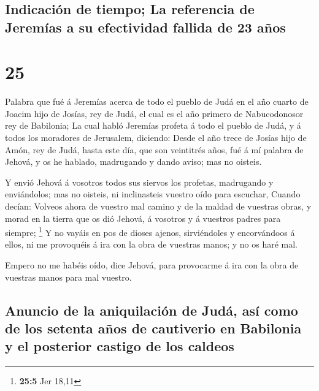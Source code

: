 \hypertarget{indicaciuxf3n-de-tiempo-la-referencia-de-jeremuxedas-a-su-efectividad-fallida-de-23-auxf1os}{%
\subsection{Indicación de tiempo; La referencia de Jeremías a su
efectividad fallida de 23
años}\label{indicaciuxf3n-de-tiempo-la-referencia-de-jeremuxedas-a-su-efectividad-fallida-de-23-auxf1os}}

\hypertarget{section-24}{%
\section{25}\label{section-24}}

 Palabra que fué á Jeremías acerca de todo el pueblo de
Judá en el año cuarto de Joacim hijo de Josías, rey de Judá, el cual es
el año primero de Nabucodonosor rey de Babilonia;  La cual
habló Jeremías profeta á todo el pueblo de Judá, y á todos los moradores
de Jerusalem, diciendo:  Desde el año trece de Josías hijo
de Amón, rey de Judá, hasta este día, que son veintitrés años, fué á mí
palabra de Jehová, y os he hablado, madrugando y dando aviso; mas no
oisteis.

 Y envió Jehová á vosotros todos sus siervos los profetas,
madrugando y enviándolos; mas no oisteis, ni inclinasteis vuestro oído
para escuchar,  Cuando decían: Volveos ahora de vuestro
mal camino y de la maldad de vuestras obras, y morad en la tierra que os
dió Jehová, á vosotros y á vuestros padres para siempre; \footnote{\textbf{25:5}
  Jer 18,11}  Y no vayáis en pos de dioses ajenos,
sirviéndoles y encorvándoos á ellos, ni me provoquéis á ira con la obra
de vuestras manos; y no os haré mal.

 Empero no me habéis oído, dice Jehová, para provocarme á
ira con la obra de vuestras manos para mal vuestro.

\hypertarget{anuncio-de-la-aniquilaciuxf3n-de-juduxe1-asuxed-como-de-los-setenta-auxf1os-de-cautiverio-en-babilonia-y-el-posterior-castigo-de-los-caldeos}{%
\subsection{Anuncio de la aniquilación de Judá, así como de los setenta
años de cautiverio en Babilonia y el posterior castigo de los
caldeos}\label{anuncio-de-la-aniquilaciuxf3n-de-juduxe1-asuxed-como-de-los-setenta-auxf1os-de-cautiverio-en-babilonia-y-el-posterior-castigo-de-los-caldeos}}

